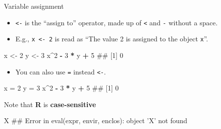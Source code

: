 \documentclass[ignorenonframetext,]{beamer}
\newenvironment{Shaded}{\begin{snugshade}}{\end{snugshade}}
\newcommand{\DecValTok}[1]{\textcolor[rgb]{0.00,0.00,0.81}{#1}}
\newcommand{\StringTok}[1]{\textcolor[rgb]{0.31,0.60,0.02}{#1}}
\newcommand{\OperatorTok}[1]{\textcolor[rgb]{0.81,0.36,0.00}{\textbf{#1}}}
\newcommand{\NormalTok}[1]{#1}
\providecommand{\tightlist}{%
  \setlength{\itemsep}{0pt}\setlength{\parskip}{0pt}}
\let\oldShaded\Shaded
\let\endoldShaded\endShaded
\renewenvironment{Shaded}{\footnotesize\oldShaded}{\endoldShaded}
\begin{document}
\begin{frame}[fragile]{Variable assignment}

\begin{itemize}
\tightlist
\item
  \texttt{\textless{}-} is the ``assign to'' operator, made up of
  \texttt{\textless{}} and \texttt{-} without a space.
\item
  E.g., \texttt{x\ \textless{}-\ 2} is read as ``The value 2 is assigned
  to the object \texttt{x}''.
\end{itemize}

\begin{Shaded}
\begin{Highlighting}[]
\NormalTok{x <-}\StringTok{ }\DecValTok{2}
\NormalTok{y <-}\StringTok{ }\DecValTok{3}
\NormalTok{x}\OperatorTok{^}\DecValTok{2} \OperatorTok{-}\StringTok{ }\DecValTok{3} \OperatorTok{*}\StringTok{ }\NormalTok{y }\OperatorTok{+}\StringTok{ }\DecValTok{5}
\NormalTok{## [1] 0}
\end{Highlighting}
\end{Shaded}

\begin{itemize}
\tightlist
\item
  You can also use \texttt{=} instead \texttt{\textless{}-}.
\end{itemize}

\begin{Shaded}
\begin{Highlighting}[]
\NormalTok{x =}\StringTok{ }\DecValTok{2}
\NormalTok{y =}\StringTok{ }\DecValTok{3}
\NormalTok{x}\OperatorTok{^}\DecValTok{2} \OperatorTok{-}\StringTok{ }\DecValTok{3} \OperatorTok{*}\StringTok{ }\NormalTok{y }\OperatorTok{+}\StringTok{ }\DecValTok{5}
\NormalTok{## [1] 0}
\end{Highlighting}
\end{Shaded}

Note that \textbf{R} is \textbf{case-sensitive}

\begin{Shaded}
\begin{Highlighting}[]
\NormalTok{X}
\NormalTok{## Error in eval(expr, envir, enclos): object 'X' not found}
\end{Highlighting}
\end{Shaded}

\end{frame}
\end{document}
